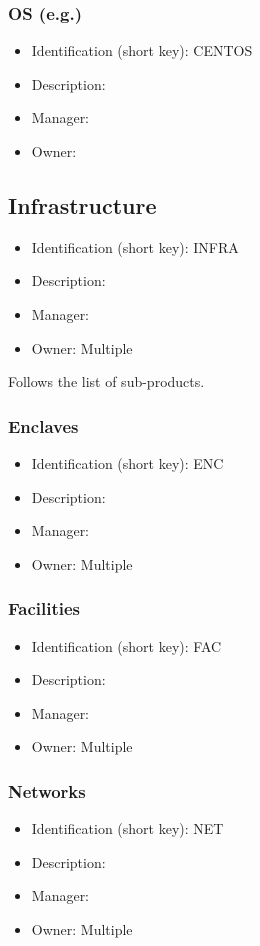 \subsubsection{OS (e.g.)}\label{sect:CENTOS}
\begin{itemize}
\item Identification (short key): CENTOS
\item Description: 
\item Manager: 
\item Owner: 
\end{itemize}

\subsection{Infrastructure}\label{sect:INFRA}
\begin{itemize}
\item Identification (short key): INFRA
\item Description: 
\item Manager: 
\item Owner: Multiple
\end{itemize}

Follows the list of sub-products.\subsubsection{Enclaves}\label{sect:ENC}
\begin{itemize}
\item Identification (short key): ENC
\item Description: 
\item Manager: 
\item Owner: Multiple
\end{itemize}

\subsubsection{Facilities}\label{sect:FAC}
\begin{itemize}
\item Identification (short key): FAC
\item Description: 
\item Manager: 
\item Owner: Multiple
\end{itemize}

\subsubsection{Networks}\label{sect:NET}
\begin{itemize}
\item Identification (short key): NET
\item Description: 
\item Manager: 
\item Owner: Multiple
\end{itemize}

